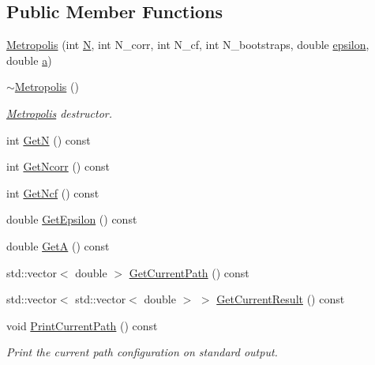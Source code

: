 \subsection*{Public Member Functions}
\begin{DoxyCompactItemize}
\item 
\hyperlink{classMetropolis_ac702bd026368a444886580d372a99018}{Metropolis} (int \hyperlink{SETTINGS_8h_a7722c8ecbb62d99aee7ce68b1752f337}{N}, int N\+\_\+corr, int N\+\_\+cf, int N\+\_\+bootstraps, double \hyperlink{SETTINGS_8h_a4904cc82627458fdf6672ccc0b2802c7}{epsilon}, double \hyperlink{SETTINGS_8h_a1031d0e0a97a340abfe0a6ab9e831045}{a})
\item 
\mbox{\label{classMetropolis_aeeea5bedaa30567a6d1a26e829a40cad}} 
\hyperlink{classMetropolis_aeeea5bedaa30567a6d1a26e829a40cad}{$\sim$\+Metropolis} ()
\begin{DoxyCompactList}\small\item\em \hyperlink{classMetropolis}{Metropolis} destructor. \end{DoxyCompactList}\item 
int \hyperlink{classMetropolis_acaa8e2e9e8e13f0333f2fc0dd17ab135}{GetN} () const
\item 
int \hyperlink{classMetropolis_abd453b3613ebecb226c0e8ad07ac26cf}{Get\+Ncorr} () const
\item 
int \hyperlink{classMetropolis_a1ac082e2dbbadb602fb30cb15d945a14}{Get\+Ncf} () const
\item 
double \hyperlink{classMetropolis_abc94add65bfe37e91150b68ddbabfc55}{Get\+Epsilon} () const
\item 
double \hyperlink{classMetropolis_a5fef962bc6deca9c57dc377ef5000432}{GetA} () const
\item 
std\+::vector$<$ double $>$ \hyperlink{classMetropolis_af58aa9fe0d0155534a9b1ad90fabbb9e}{Get\+Current\+Path} () const
\item 
std\+::vector$<$ std\+::vector$<$ double $>$ $>$ \hyperlink{classMetropolis_ab8f12fd15c8f3b44bf7384918f9427c8}{Get\+Current\+Result} () const
\item 
\mbox{\label{classMetropolis_ac14a16ae31144d70014ae8023c5a9001}} 
void \hyperlink{classMetropolis_ac14a16ae31144d70014ae8023c5a9001}{Print\+Current\+Path} () const
\begin{DoxyCompactList}\small\item\em Print the current path configuration on standard output. \end{DoxyCompactList}\item 

\end{DoxyCompactItemize}
